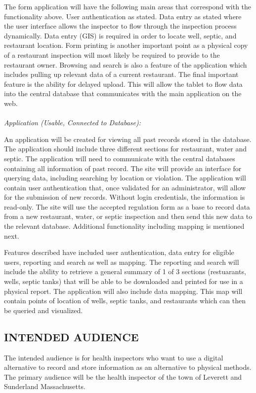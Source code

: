 \documentclass[twoside,letterpaper]{article}
\begin{document}
{The form application will have the following main areas that correspond with the functionality above. User authentication as stated. Data entry as stated where the user interface allows the inspector to flow through the inspection process dynamically. Data entry (GIS) is required in order to locate well, septic, and restaurant location. Form printing is another important point as a physical copy of a restaurant inspection will most likely be required to provide to the restaurant owner. Browsing and search is also a feature of the application which includes pulling up relevant data of a current restaurant. The final important feature is the ability for delayed upload. This will allow the tablet to flow data into the central database that communicates with the main application on the web.
\\ \\
\textit{Application (Usable, Connected to Database):}
\newline

An application will be created for viewing all past records stored in the database. The application should include three different sections for restaurant, water and septic.  The application will need to communicate with the central databases containing all information of past record. The site will provide an interface for querying data, including searching by location or violation. The application will contain user authentication that, once validated for an administrator, will allow for the submission of new records. Without login credentials, the information is read-only. The site will use the accepted regulation form as a base to record data from a new restaurant, water, or septic inspection and then send this new data to the relevant database. Additional functionality including mapping is mentioned next.
\newline 

Features described have included user authentication, data entry for eligible users, reporting and search as well as mapping. The reporting and search will include the ability to retrieve a general summary of 1 of 3 sections (restuarants, wells, septic tanks) that will be able to be downloaded and printed for use in a physical report. The application will also include data mapping. This map will contain points of location of wells, septic tanks, and restaurants which can then be queried and visualized. }

\subsection[INTENDED AUDIENCE]{\rmfamily\bfseries\color{black}
INTENDED AUDIENCE}
{\rmfamily\color{black}
		The intended audience is for health inspectors who want to use a digital alternative to record and store information as an alternative to physical methods. The primary audience will be the health inspector of the town of Leverett and Sunderland Massachusetts.}
\end{document}
